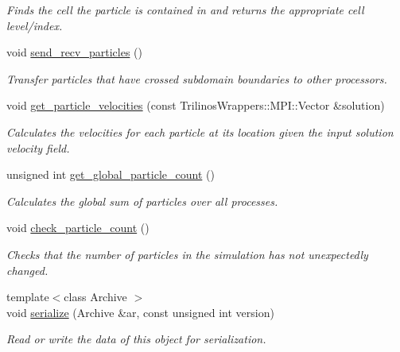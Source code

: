 \begin{DoxyCompactItemize}
\begin{DoxyCompactList}\small\item\em Finds the cell the particle is contained in and returns the appropriate cell level/index. \end{DoxyCompactList}\item 
void \hyperlink{classps__mmm_1_1_particle_1_1_world_a7dd44b277bed2ef78643f137f9aca824}{send\+\_\+recv\+\_\+particles} ()
\begin{DoxyCompactList}\small\item\em Transfer particles that have crossed subdomain boundaries to other processors. \end{DoxyCompactList}\item 
void \hyperlink{classps__mmm_1_1_particle_1_1_world_a6050b826fa0e9a84cbd341d67894c17c}{get\+\_\+particle\+\_\+velocities} (const Trilinos\+Wrappers\+::\+M\+P\+I\+::\+Vector \&solution)
\begin{DoxyCompactList}\small\item\em Calculates the velocities for each particle at its location given the input solution velocity field. \end{DoxyCompactList}\item 
unsigned int \hyperlink{classps__mmm_1_1_particle_1_1_world_aecc4283ffe7f467e6908e19462165d14}{get\+\_\+global\+\_\+particle\+\_\+count} ()
\begin{DoxyCompactList}\small\item\em Calculates the global sum of particles over all processes. \end{DoxyCompactList}\item 
void \hyperlink{classps__mmm_1_1_particle_1_1_world_a9e8972fc81009612354d5720bb4e9cd6}{check\+\_\+particle\+\_\+count} ()
\begin{DoxyCompactList}\small\item\em Checks that the number of particles in the simulation has not unexpectedly changed. \end{DoxyCompactList}\item 
{\footnotesize template$<$class Archive $>$ }\\void \hyperlink{classps__mmm_1_1_particle_1_1_world_af865e7ffc56986f8686f7cee87a06c8d}{serialize} (Archive \&ar, const unsigned int version)
\begin{DoxyCompactList}\small\item\em Read or write the data of this object for serialization. \end{DoxyCompactList}\end{DoxyCompactItemize}


